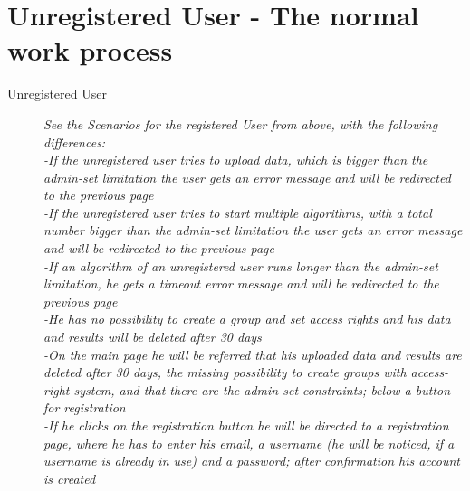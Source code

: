 \section{Unregistered User - The normal work process}
\begin{description}
  \item [Unregistered User]
    \textit{See the Scenarios for the registered User from above, with the following differences:
		\\-If the unregistered user tries to upload data, which is bigger than the admin-set limitation the user gets an error message and will be redirected to the previous page
		\\-If the unregistered user tries to start multiple algorithms, with a total number bigger than the admin-set limitation the user gets an error message and will be redirected to the previous page
		\\-If an algorithm of an unregistered user runs longer than the admin-set limitation, he gets a timeout error message and will be redirected to the previous page
		\\-He has no possibility to create a group and set access rights and his data and results will be deleted after 30 days
		\\-On the main page he will be referred that his uploaded data and results are deleted after 30 days, the missing possibility to create groups with access-right-system, and that there are the admin-set constraints; below a button for registration
		\\-If he clicks on the registration button he will be directed to a registration page, where he has to enter his email, a username (he will be noticed, if a username is already in use) and a password; after confirmation his account is created
}
\end{description}

